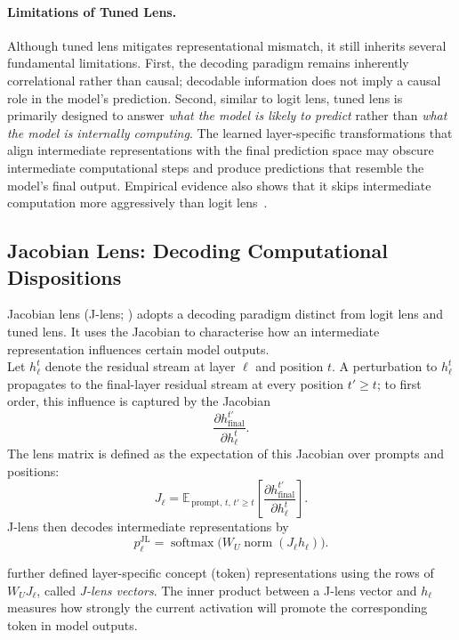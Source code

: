 \paragraph{Limitations of Tuned Lens.}
Although tuned lens mitigates representational mismatch, it still inherits several fundamental limitations. First, the decoding paradigm remains inherently correlational rather than causal; decodable information does not imply a causal role in the model's prediction. Second, similar to logit lens, tuned lens is primarily designed to answer \emph{what the model is likely to predict} rather than \emph{what the model is internally computing}. The learned layer-specific transformations that align intermediate representations with the final prediction space may obscure intermediate computational steps and produce predictions that resemble the model's final output. Empirical evidence also shows that it skips intermediate computation more aggressively than logit lens~.

\subsection{Jacobian Lens: Decoding Computational Dispositions}
\begin{definitionbox}
Jacobian lens (J-lens; ) adopts a decoding paradigm distinct from logit lens and tuned lens. It uses the Jacobian to characterise how an intermediate representation influences certain model outputs.\\

Let $h_\ell^t$ denote the residual stream at layer $\ell$ and position $t$. A perturbation to $h_\ell^t$ propagates to the final-layer residual stream at every position $t' \geq t$; to first order, this influence is captured by the Jacobian
\[
\frac{\partial h_{\mathrm{final}}^{t'}}{\partial h_\ell^t}.
\]
The lens matrix is defined as the expectation of this Jacobian over prompts and positions:
\[
J_\ell
=
\mathbb{E}_{\,\mathrm{prompt},\,t,\,t' \ge t}
\left[
\frac{\partial h_{\mathrm{final}}^{t'}}
{\partial h_\ell^t}
\right].
\]
J-lens then decodes intermediate representations by
\[
p_\ell^{\mathrm{JL}}
=
\operatorname{softmax}
\!\big(
W_U \operatorname{norm}(J_\ell h_\ell)
\big).
\]

 further defined layer-specific concept (token) representations using the rows of $W_U J_\ell$, called \emph{J-lens vectors}. The inner product between a J-lens vector and $h_\ell$ measures how strongly the current activation will promote the corresponding token in model outputs.
\end{definitionbox}

